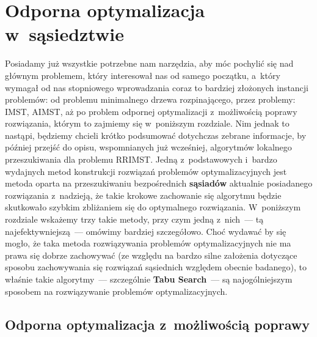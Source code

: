 \chapter{Odporna optymalizacja w~sąsiedztwie}\label{ch:localSearch}
\thispagestyle{chapterBeginStyle}





Posiadamy już wszystkie potrzebne nam narzędzia, aby móc pochylić się nad głównym problemem, który interesował nas od samego początku, a~który wymagał od nas stopniowego wprowadzania coraz to bardziej złożonych instancji problemów: od problemu minimalnego drzewa rozpinającego, przez problemy: \textsc{IMST}, \textsc{AIMST}, aż po problem odpornej optymalizacji z~możliwością poprawy rozwiązania, którym to zajmiemy się w~poniższym rozdziale.
Nim jednak to nastąpi, będziemy chcieli krótko podsumować dotychczas zebrane informacje, by później przejść do opisu, wspomnianych już wcześniej, algorytmów lokalnego przeszukiwania dla problemu \textsc{RRIMST}.
Jedną z~podstawowych i~bardzo wydajnych metod konstrukcji rozwiązań problemów optymalizacyjnych jest metoda oparta na przeszukiwaniu bezpośrednich \textbf{sąsiadów} aktualnie posiadanego rozwiązania z~nadzieją, że takie krokowe zachowanie się algorytmu będzie skutkowało szybkim zbliżaniem się do optymalnego rozwiązania.
W~poniższym rozdziale wskażemy trzy takie metody, przy czym jedną z~nich~--- tą najefektywniejszą~--- omówimy bardziej szczegółowo.
Choć wydawać by się mogło, że taka metoda rozwiązywania problemów optymalizacyjnych nie ma prawa się dobrze zachowywać (ze względu na bardzo silne założenia dotyczące sposobu zachowywania się rozwiązań sąsiednich względem obecnie badanego), to właśnie takie algorytmy~--- szczególnie \textbf{Tabu Search}~--- są najogólniejszym sposobem na rozwiązywanie problemów optymalizacyjnych.




\section{Odporna optymalizacja z~możliwością poprawy}




